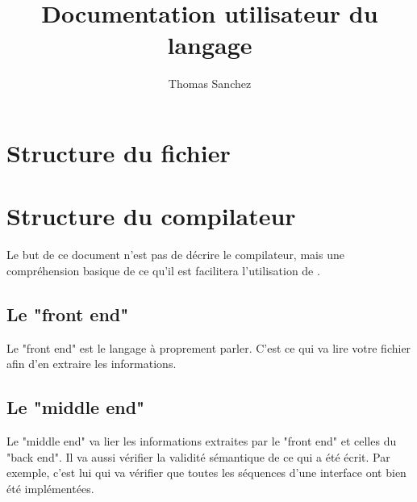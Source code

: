 \documentclass{rtxreport}
\author{Thomas Sanchez}
\title{Documentation utilisateur du langage}
\begin{document}
\maketitle

\rtxmaketitleblock

\tableofcontents


\lstset{language=rathaxes}

\chapter{Structure du fichier}


\chapter{Structure du compilateur}


Le but de ce document n'est pas de d\'ecrire le compilateur, mais une compréhension basique de ce qu'il est
facilitera l'utilisation de \rtx.


\section{Le "front end"}

Le "front end" est le langage \`a proprement parler. C'est ce qui va lire votre fichier afin d'en extraire
les informations.

\section{Le "middle end"}

Le "middle end" va lier les informations extraites par le "front end" et celles du "back end". Il va aussi vérifier
la validité sémantique de ce qui a été écrit. Par exemple, c'est lui qui va vérifier que toutes les séquences
d'une interface ont bien été implémentées.
\end{document}
